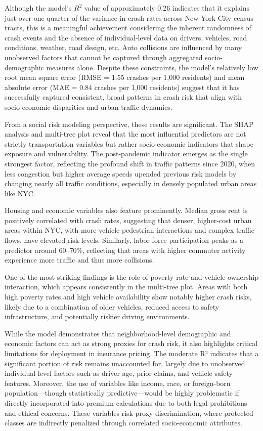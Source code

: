 \documentclass[
  number,
  review,
  3p]{elsarticle}
\begin{document}
Although the model's \(R^2\) value of approximately 0.26 indicates that
it explains just over one-quarter of the variance in crash rates across
New York City census tracts, this is a meaningful achievement
considering the inherent randomness of crash events and the absence of
individual-level data on drivers, vehicles, road conditions, weather,
road design, etc. Auto collisions are influenced by many unobserved
factors that cannot be captured through aggregated socio-demographic
measures alone. Despite these constraints, the model's relatively low
root mean square error (RMSE = 1.55 crashes per 1,000 residents) and
mean absolute error (MAE = 0.84 crashes per 1,000 residents) suggest
that it has successfully captured consistent, broad patterns in crash
risk that align with socio-economic disparities and urban traffic
dynamics.

From a social risk modeling perspective, these results are significant.
The SHAP analysis and multi-tree plot reveal that the most influential
predictors are not strictly transportation variables but rather
socio-economic indicators that shape exposure and vulnerability. The
post-pandemic indicator emerges as the single strongest factor,
reflecting the profound shift in traffic patterns since 2020, when less
congestion but higher average speeds upended previous risk models by
changing nearly all traffic conditions, especially in densely populated
urban areas like NYC.

Housing and economic variables also feature prominently. Median gross
rent is positively correlated with crash rates, suggesting that denser,
higher-cost urban areas within NYC, with more vehicle-pedestrian
interactions and complex traffic flows, have elevated risk levels.
Similarly, labor force participation peaks as a predictor around
60--70\%, reflecting that areas with higher commuter activity experience
more traffic and thus more collisions.

One of the most striking findings is the role of poverty rate and
vehicle ownership interaction, which appears consistently in the
multi-tree plot. Areas with both high poverty rates and high vehicle
availability show notably higher crash risks, likely due to a
combination of older vehicles, reduced access to safety infrastructure,
and potentially riskier driving environments.

While the model demonstrates that neighborhood-level demographic and
economic factors can act as strong proxies for crash risk, it also
highlights critical limitations for deployment in insurance pricing. The
moderate R² indicates that a significant portion of risk remains
unaccounted for, largely due to unobserved individual-level factors such
as driver age, prior claims, and vehicle safety features. Moreover, the
use of variables like income, race, or foreign-born population---though
statistically predictive---would be highly problematic if directly
incorporated into premium calculations due to both legal prohibitions
and ethical concerns. These variables risk proxy discrimination, where
protected classes are indirectly penalized through correlated
socio-economic attributes.
\end{document}
